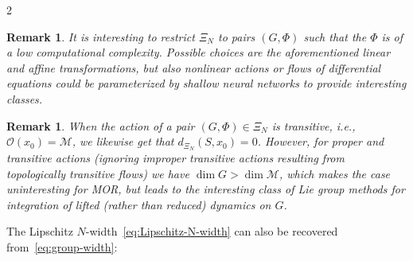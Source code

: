 \documentclass{article}
\newtheorem{remark}[theorem]{Remark}
\newcommand{\M}{\mathcal{M}}                                %
\newcommand{\state}{x}
\begin{document}
\begin{multicols}{2}
\begin{remark}
    It is interesting to restrict $\Xi_N$ to pairs $(G,\Phi)$ such that the $\Phi$ is of a low computational complexity. Possible choices are the aforementioned linear and affine transformations, but also nonlinear actions or flows of differential equations could be parameterized by shallow neural networks to provide interesting classes. %
\end{remark} 
\begin{remark}
    When the action of a pair $(G,\Phi) \in \Xi_N$ is transitive, i.e., $\mathcal{O}(\state_0) = \M$, we likewise get that $d_{\Xi_N}(S,\state_0) = 0$. However, for proper and transitive actions (ignoring improper transitive actions resulting from topologically transitive flows) we have $\dim G > \dim \M$, which makes the case uninteresting for MOR, but leads to the interesting class of Lie group methods for integration of lifted (rather than reduced) dynamics on $G$. 
\end{remark}





The Lipschitz $N$-width~\eqref{eq:Lipschitz-N-width} can also be recovered from~\eqref{eq:group-width}:


\end{multicols}
\end{document}
